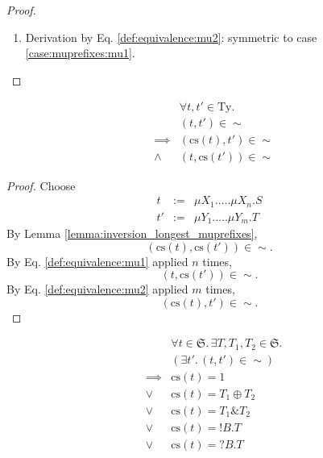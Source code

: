 \documentclass{llncs}
\newcommand*{\Ty}{\mathrm{Ty}}
\newcommand*{\Sy}{\mathfrak{S}}
\newcommand*{\cs}{\mathrm{cs}}
\newcommand*{\sequiv}{\sim}
\newcommand*{\send}{\mathord{!}}
\newcommand*{\recv}{\mathord{?}}
\newcommand*{\echoice}{\oplus}
\newcommand*{\ichoice}{\mathop{\&}}
\renewcommand*{\|}{\;|\;}
\begin{document}
\begin{proof}
\begin{enumerate}
\begin{enumerate}
        \item
          \label{case:muprefixes:mu2}
          Derivation by Eq. \ref{def:equivalence:mu2}: symmetric to case
          \ref{case:muprefixes:mu1}.
      \end{enumerate}
  \end{enumerate}
\end{proof}

\begin{lemma}
  \label{lemma:inversion_longest_muprefixes:one-sided}
  \begin{eqnarray*}
    && \forall t, t' \in \Ty. \\
    && (t, t') \in \sequiv \\
    &\implies& (\cs(t), t') \in \sequiv \\
    &\land&    (t, \cs(t')) \in \sequiv
  \end{eqnarray*}
\end{lemma}

\begin{proof}
  Choose
  \begin{eqnarray*}
    t  &:=& \mu X_1.\dots.\mu X_n.S \\
    t' &:=& \mu Y_1.\dots.\mu Y_m.T
  \end{eqnarray*}
  By Lemma \ref{lemma:inversion_longest_muprefixes},
  \begin{equation*}
    (\cs(t), \cs(t')) \in \sequiv.
  \end{equation*}
  By Eq. \ref{def:equivalence:mu1} applied $n$ times,
  \begin{equation*}
    (t, \cs(t')) \in \sequiv.
  \end{equation*}
  By Eq. \ref{def:equivalence:mu2} applied $m$ times,
  \begin{equation*}
    (\cs(t), t') \in \sequiv.
  \end{equation*}
\end{proof}

\begin{lemma}
  \label{lemma:complete_substitution_shape:equivalence}
  \begin{eqnarray*}
    && \forall t \in \Sy.\, \exists T, T_1, T_2 \in \Sy. \\
    && (\exists t'.\, (t, t') \in \sequiv) \\
    &\implies& \cs(t) = 1 \\
    &\lor&     \cs(t) = T_1 \echoice T_2 \\
    &\lor&     \cs(t) = T_1 \ichoice T_2 \\
    &\lor&     \cs(t) = \send B.T \\
    &\lor&     \cs(t) = \recv B.T
  \end{eqnarray*}
\end{lemma}
\end{document}
